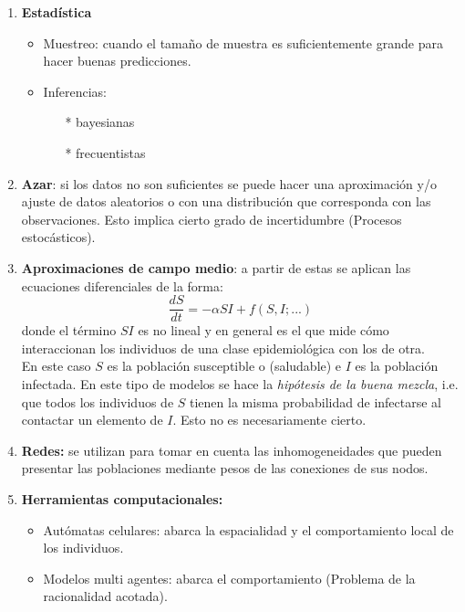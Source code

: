 \documentclass[10pt,oneside]{article}
\theoremstyle{definition}
\begin{document}
\begin{multicols}{2}
    \begin{enumerate}
        \item \textbf{Estadística}
        \begin{itemize}
            \item Muestreo: cuando el tamaño de muestra es suficientemente grande para hacer buenas predicciones.
            \item Inferencias:
            \begin{itemize}
                \item[*] bayesianas
                \item[*] frecuentistas
            \end{itemize}
        \end{itemize}
        \item \textbf{Azar}: si los datos no son suficientes se puede hacer una aproximación y/o ajuste de datos aleatorios o con una distribución que corresponda con las observaciones. Esto implica cierto grado de incertidumbre (Procesos estocásticos).
        \item \textbf{Aproximaciones de campo medio}: a partir de estas se aplican las ecuaciones diferenciales de la forma:
        $$\frac{dS}{dt}=-\alpha SI+ f(S,I;...)$$
        donde el término $SI$ es no lineal y en general es el que mide cómo interaccionan los individuos de una clase epidemiológica con los de otra. \\ \newline En este caso $S$ es la población susceptible o (saludable) e $I$ es la población infectada. En este tipo de modelos se hace la \textit{hipótesis de la buena mezcla}, i.e. que todos los individuos de $S$ tienen la misma probabilidad de infectarse al contactar un elemento de $I$. Esto no es necesariamente cierto.
        \item \textbf{Redes:} se utilizan para tomar en cuenta las inhomogeneidades que pueden presentar las poblaciones mediante pesos de las conexiones de sus nodos.
        \item \textbf{Herramientas computacionales:}
        \begin{itemize}
            \item Autómatas celulares: abarca la espacialidad y el comportamiento local de los individuos.
            \item Modelos multi agentes: abarca el comportamiento (Problema de la racionalidad acotada).
        \end{itemize}
    \end{enumerate}
    

\end{multicols}
\end{document}
